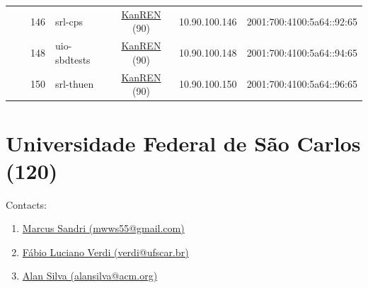 \begin{small}
\begin{center}
\begin{longtable}{|c|c|c|c|c|c|c|c|}
  &  & \tiny{146} & \multicolumn{1}{|l|}{\tiny{srl-cps}} & \multicolumn{2}{|c|}{\tiny{\href{http://www.kanren.net}{KanREN} (90)}} & \tiny{10.90.100.146} & \tiny{2001:700:4100:5a64::92:65} \\* \cline{3-3}\cline{4-4}\cline{5-5}\cline{6-6}\cline{7-7}\cline{8-8}
  &  & \tiny{148} & \multicolumn{1}{|l|}{\tiny{uio-sbdtests}} & \multicolumn{2}{|c|}{\tiny{\href{http://www.kanren.net}{KanREN} (90)}} & \tiny{10.90.100.148} & \tiny{2001:700:4100:5a64::94:65} \\* \cline{3-3}\cline{4-4}\cline{5-5}\cline{6-6}\cline{7-7}\cline{8-8}
  &  & \tiny{150} & \multicolumn{1}{|l|}{\tiny{srl-thuen}} & \multicolumn{2}{|c|}{\tiny{\href{http://www.kanren.net}{KanREN} (90)}} & \tiny{10.90.100.150} & \tiny{2001:700:4100:5a64::96:65} \\ \hline
\end{longtable}
\end{center}
\end{small}



\section{Universidade Federal de São Carlos (120)}
\label{sec:UFSCAR}

Contacts:
\begin{enumerate}
 \item {}\href{mailto:mwws55@gmail.com}{Marcus Sandri (mwws55@gmail.com)}
 \item {}\href{mailto:verdi@ufscar.br}{Fábio Luciano Verdi (verdi@ufscar.br)}
 \item {}\href{mailto:alansilva@acm.org}{Alan Silva (alansilva@acm.org)}
\end{enumerate}

